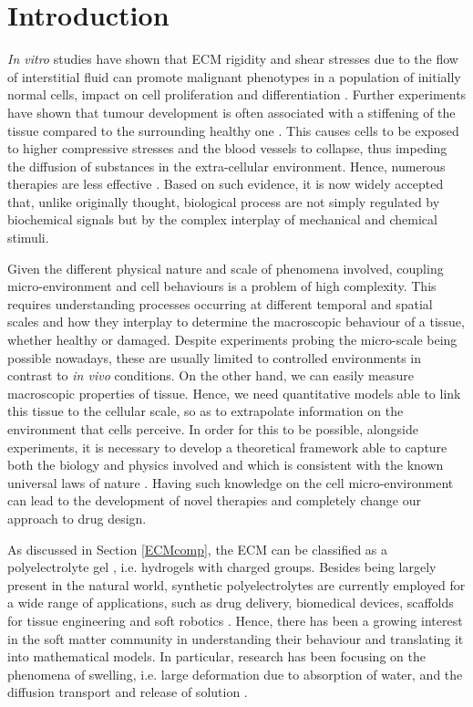 \section{Introduction}

\textit{In vitro} studies have shown that ECM rigidity and shear stresses due to the flow of interstitial fluid can promote malignant phenotypes in a population of initially normal cells, impact on cell proliferation and differentiation \cite{ex3}. Further experiments have shown that tumour development is often associated with a stiffening of the tissue compared to the surrounding healthy one \cite{ex4}. This causes cells to be exposed to higher compressive stresses and the blood vessels to collapse, thus impeding the diffusion of substances in the extra-cellular environment. Hence, numerous therapies are less effective \cite{ecm2}. Based on such evidence, it is now widely accepted that, unlike originally thought, biological process are not simply regulated by biochemical signals but by the complex interplay of mechanical and chemical stimuli.
 
Given the different physical nature and scale of phenomena involved, coupling micro-environment and cell behaviours is a problem of high complexity. This requires understanding processes occurring at different temporal and spatial scales and how they interplay to determine the macroscopic behaviour of a tissue, whether healthy or damaged. Despite experiments probing the micro-scale being possible nowadays, these are usually limited to controlled environments in contrast to \textit{in vivo} conditions. On the other hand, we can easily measure macroscopic properties of tissue. Hence, we need quantitative models able to link this tissue to the cellular scale, so as to extrapolate information on the environment that cells perceive. In order for this to be possible, alongside experiments, it is necessary to develop a theoretical framework able to capture both the biology and physics involved and which is consistent with the known universal laws of nature \cite{NET}. Having such knowledge on the cell micro-environment can lead to the development of novel therapies and completely change our approach to drug design.  

As discussed in Section \ref{ECMcomp}, the ECM can be classified as a polyelectrolyte gel \cite{ecm1,ecm2}, i.e. hydrogels with charged groups. Besides being largely present in the natural world, synthetic polyelectrolytes are currently employed for a wide range of applications, such as drug delivery, biomedical devices, scaffolds for tissue engineering and soft robotics \cite{hydroex3,hydroex2,hydroex1,hydroex4}. Hence, there has been a growing interest in the soft matter community in understanding their behaviour and translating it into mathematical models. In particular, research has been focusing on the phenomena of swelling, i.e. large deformation due to absorption of water, and the diffusion transport and release of solution \cite{DROZDOV+,DROZDOVph,Reviewpolyel,swell2}.

